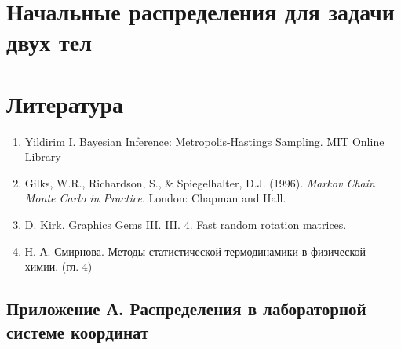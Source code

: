 \documentclass[12pt]{article}
\begin{document}
\section{Начальные распределения для задачи двух тел}







\newpage
\section{Литература}
\begin{enumerate}
	\item Yildirim I. Bayesian Inference: Metropolis-Hastings Sampling. MIT Online Library
	\item Gilks, W.R., Richardson, S., \& Spiegelhalter, D.J. (1996). \textit{Markov Chain Monte Carlo in Practice}. London: Chapman and Hall.
	\item  D. Kirk. Graphics Gems III. III. 4. Fast random rotation matrices. 
	\item Н. А. Смирнова. Методы статистической термодинамики в физической химии. (гл. 4)
\end{enumerate}

\newpage


\begin{appendices}
\section{Приложение А. Распределения в лабораторной системе координат} \label{app1}



\end{appendices}
\end{document}
